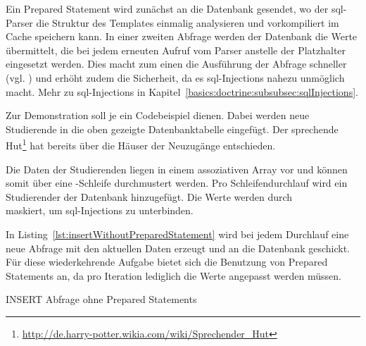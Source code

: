 Ein Prepared Statement wird zunächst an die Datenbank gesendet, wo der \gls{sql}-Parser die Struktur des Templates einmalig analysieren und vorkompiliert im Cache speichern kann. In einer zweiten Abfrage werden der Datenbank die Werte übermittelt, die bei jedem erneuten Aufruf vom Parser anstelle der Platzhalter eingesetzt werden. Dies macht zum einen die Ausführung der Abfrage schneller (vgl. \cite[S. 75]{book:popel2007pdo}) und erhöht zudem die Sicherheit, da es \gls{sql}-Injections nahezu unmöglich macht. Mehr zu \gls{sql}-Injections in Kapitel~\ref{basics:doctrine:subsubsec:sqlInjections}.

Zur Demonstration soll je ein Codebeispiel dienen. Dabei werden neue Studierende in die oben gezeigte Datenbanktabelle eingefügt. Der sprechende Hut\footnote{\url{http://de.harry-potter.wikia.com/wiki/Sprechender_Hut}} hat bereits über die Häuser der Neuzugänge entschieden.

Die Daten der Studierenden liegen in einem assoziativen Array vor und können somit über eine -Schleife durchmustert werden. Pro Schleifendurchlauf wird ein Studierender der Datenbank hinzugefügt. Die Werte werden durch\\
 maskiert, um \gls{sql}-Injections zu unterbinden.

In Listing~\ref{lst:insertWithoutPreparedStatement} wird bei jedem Durchlauf eine neue Abfrage mit den aktuellen Daten erzeugt und an die Datenbank geschickt. Für diese wiederkehrende Aufgabe bietet sich die Benutzung von Prepared Statements an, da pro Iteration lediglich die Werte angepasst werden müssen.

\begin{listing}[H]
\caption{INSERT Abfrage ohne Prepared Statements}
\label{lst:insertWithoutPreparedStatement}
\end{listing}

